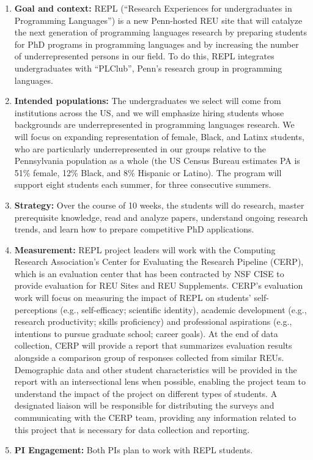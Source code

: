 \begin{enumerate}
\item {\bf Goal and context:} REPL (``Research Experiences for
undergraduates in Programming Languages'') is a new
Penn-hosted REU site that will catalyze the next generation of
programming languages research by preparing students for PhD programs
in programming languages and by increasing the number of
underrepresented persons in our field. To do this, REPL integrates
undergraduates with ``PLClub'', Penn’s research group in programming
languages.

\item {\bf Intended populations:} The undergraduates we select will
come from institutions across the US, and we will emphasize hiring
students whose backgrounds are underrepresented in programming
languages research. We will focus on expanding representation of
female, Black, and Latinx students, who are particularly
underrepresented in our
groups relative to the Pennsylvania population as a whole (the US Census Bureau
estimates PA is 51\% female, 12\% Black, and 8\% Hispanic or Latino).  The
program will support eight students  each
summer, for three consecutive summers.
\item {\bf Strategy:} Over the course of 10 weeks, the students will do
research, master prerequisite knowledge, read and analyze papers, understand
ongoing research trends, and learn how to prepare competitive PhD applications.
\item {\bf Measurement:}
REPL project leaders will work with the Computing Research Association’s Center for Evaluating the Research Pipeline (CERP), which is an evaluation center that has been contracted by NSF CISE to provide evaluation for REU Sites and REU Supplements. CERP’s evaluation work will focus on measuring the impact of REPL on students’ self-perceptions (e.g., self-efficacy; scientific identity), academic development (e.g., research productivity; skills proficiency) and professional aspirations (e.g., intentions to pursue graduate school; career goals). At the end of data collection, CERP will provide a report that summarizes evaluation results alongside a comparison group of responses collected from similar REUs. Demographic data and other student characteristics will be provided in the report with an intersectional lens when possible, enabling the project team to understand the impact of the project on different types of students. A designated liaison will be responsible for distributing the surveys and communicating with the CERP team, providing any information related to this project that is necessary for data collection and reporting.
\item {\bf PI Engagement:} Both PIs plan to work with REPL students.
\iflater{}\fi
\end{enumerate}

